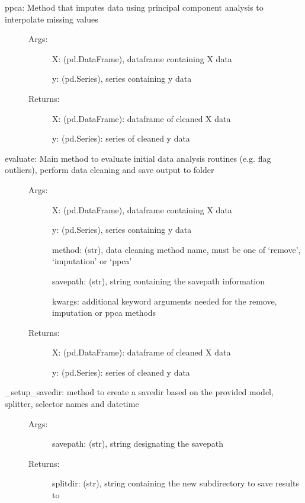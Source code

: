 \documentclass[letterpaper,10pt,english]{sphinxmanual}
\begin{document}
\begin{fulllineitems}
\begin{description}
\begin{description}
\item[{ppca: Method that imputes data using principal component analysis to interpolate missing values}] \leavevmode\begin{description}
\item[{Args:}] \leavevmode
X: (pd.DataFrame), dataframe containing X data

y: (pd.Series), series containing y data

\item[{Returns:}] \leavevmode
X: (pd.DataFrame): dataframe of cleaned X data

y: (pd.Series): series of cleaned y data

\end{description}

\item[{evaluate: Main method to evaluate initial data analysis routines (e.g. flag outliers), perform data cleaning and save output to folder}] \leavevmode\begin{description}
\item[{Args:}] \leavevmode
X: (pd.DataFrame), dataframe containing X data

y: (pd.Series), series containing y data

method: (str), data cleaning method name, must be one of ‘remove’, ‘imputation’ or ‘ppca’

savepath: (str), string containing the savepath information

kwargs: additional keyword arguments needed for the remove, imputation or ppca methods

\item[{Returns:}] \leavevmode
X: (pd.DataFrame): dataframe of cleaned X data

y: (pd.Series): series of cleaned y data

\end{description}

\item[{\_setup\_savedir: method to create a savedir based on the provided model, splitter, selector names and datetime}] \leavevmode\begin{description}
\item[{Args:}] \leavevmode
savepath: (str), string designating the savepath

\item[{Returns:}] \leavevmode
splitdir: (str), string containing the new subdirectory to save results to

\end{description}


\end{description}
\end{description}
\end{fulllineitems}
\end{document}
